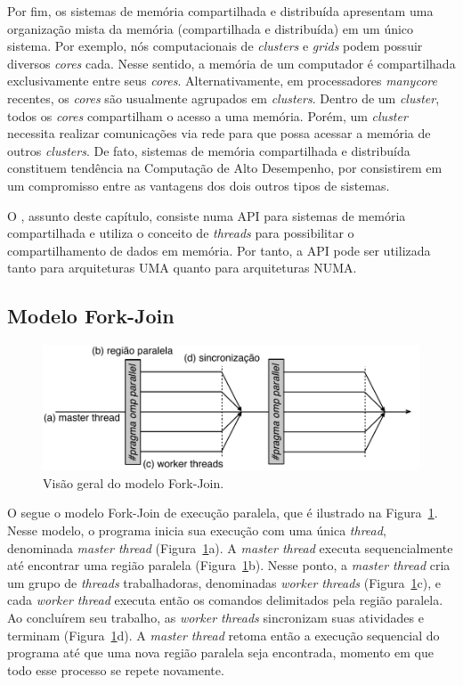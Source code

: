\documentclass{SBCbookchapter}
\begin{document}
		Por fim, os sistemas de memória compartilhada e distribuída
		apresentam uma organização mista da memória (compartilhada e
		distribuída) em um único sistema. Por exemplo, nós
		computacionais de \textit{clusters} e \textit{grids} podem
		possuir diversos \textit{cores} cada. Nesse sentido, a memória
		de um computador é compartilhada exclusivamente entre seus
		\textit{cores}. Alternativamente, em processadores
		\textit{manycore} recentes, os \textit{cores} são usualmente
		agrupados em \textit{clusters}. Dentro de um \textit{cluster},
		todos os \textit{cores} compartilham o acesso a uma memória.
		Porém, um \textit{cluster} necessita realizar comunicações via
		rede para que possa acessar a memória de outros
		\textit{clusters}. De fato, sistemas de memória compartilhada e
		distribuída constituem tendência na Computação de Alto
		Desempenho, por consistirem em um compromisso entre as vantagens
		dos dois outros tipos de sistemas.

		O \openmp, assunto deste capítulo, consiste numa API para
		sistemas de memória compartilhada e utiliza o conceito de
		\textit{threads} para possibilitar o compartilhamento de dados
		em memória. Por tanto, a API pode ser utilizada tanto para
		arquiteturas UMA quanto para arquiteturas NUMA.
		
	\subsection{Modelo Fork-Join}

		\begin{figure}[b]
			\centering
			\includegraphics[width=0.8\linewidth]{img/fork-join}
			\caption{Visão geral do modelo Fork-Join.}\label{fig:fork-join}
		\end{figure}

		O \openmp segue o modelo Fork-Join de execução paralela, que é
		ilustrado na Figura~\ref{fig:fork-join}. Nesse modelo, o
		programa inicia sua execução com uma única \textit{thread},
		denominada \textit{master thread} (Figura~\ref{fig:fork-join}a).
		A \textit{master thread} executa sequencialmente até encontrar
		uma região paralela (Figura~\ref{fig:fork-join}b). Nesse ponto,
		a \textit{master thread} cria um grupo de \textit{threads}
		trabalhadoras, denominadas \textit{worker threads}
		(Figura~\ref{fig:fork-join}c), e cada \textit{worker thread}
		executa então os comandos delimitados pela região paralela. Ao
		concluírem seu trabalho, as \textit{worker threads} sincronizam
		suas atividades e terminam (Figura~\ref{fig:fork-join}d). A
		\textit{master thread} retoma então a execução sequencial do
		programa até que uma nova região paralela seja encontrada,
		momento em que todo esse processo se repete novamente.
		
\end{document}
